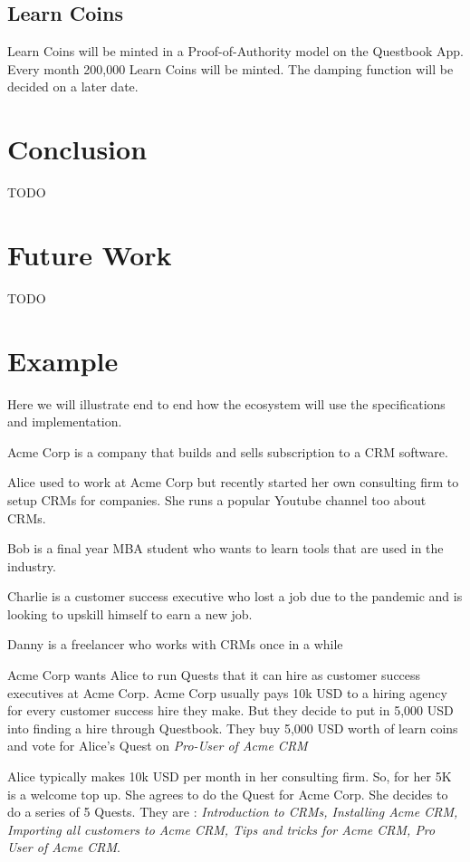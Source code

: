 \documentclass{article}
\begin{document}
    \subsection{Learn Coins}
      Learn Coins will be minted in a Proof-of-Authority model on the Questbook App. Every month 200,000 Learn Coins will be minted. The damping function will be decided on a later date.
  \section{Conclusion}
  TODO
  \section{Future Work}
  TODO
  \section{Example}
    Here we will illustrate end to end how the ecosystem will use the specifications and implementation.
    \par
    Acme Corp is a company that builds and sells subscription to a CRM software.
    \par
    Alice used to work at Acme Corp but recently started her own consulting firm to setup CRMs for companies. She runs a popular Youtube channel too about CRMs.
    \par
    Bob is a final year MBA student who wants to learn tools that are used in the industry.
    \par
    Charlie is a customer success executive who lost a job due to the pandemic and is looking to upskill himself to earn a new job.
    \par
    Danny is a freelancer who works with CRMs once in a while
    \par
    Acme Corp wants Alice to run Quests that it can hire as customer success executives at Acme Corp.
    Acme Corp usually pays 10k USD to a hiring agency for every customer success hire they make. But they decide to put in 5,000 USD into finding a hire through Questbook. They buy 5,000 USD worth of learn coins and vote for Alice's Quest on \textit{Pro-User of Acme CRM}
    \par
    Alice typically makes 10k USD per month in her consulting firm. So, for her 5K is a welcome top up. She agrees to do the Quest for Acme Corp. She decides to do a series of 5 Quests.
    They are : \textit{Introduction to CRMs, Installing Acme CRM, Importing all customers to Acme CRM, Tips and tricks for Acme CRM, Pro User of Acme CRM}.
\end{document}
